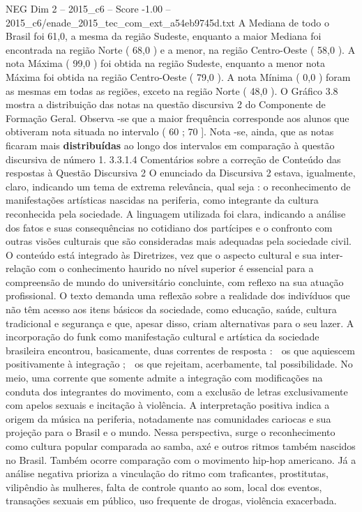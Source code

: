 \begin{textsample}{NEG Dim 2 – 2015\_c6 – Score -1.00 – 2015\_c6/enade\_2015\_tec\_com\_ext\_a54eb9745d.txt}
A Mediana de todo o Brasil foi 61,0, a mesma da região Sudeste, enquanto a maior Mediana foi encontrada na região Norte ( 68,0 ) e a menor, na região Centro-Oeste ( 58,0 ).
A nota Máxima ( 99,0 ) foi obtida na região Sudeste, enquanto a menor nota Máxima foi obtida na região Centro-Oeste ( 79,0 ).
A nota Mínima ( 0,0 ) foram as mesmas em todas as regiões, exceto na região Norte ( 48,0 ).
O Gráfico 3.8 mostra a distribuição das notas na questão discursiva 2 do Componente de Formação Geral.
Observa -se que a maior frequência corresponde aos alunos que obtiveram nota situada no intervalo ( 60 ; 70 ].
Nota -se, ainda, que as notas ficaram mais \textbf{distribuídas} ao longo dos intervalos em comparação à questão discursiva de número 1. 3.3.1.4 Comentários sobre a correção de Conteúdo das respostas à Questão Discursiva 2 O enunciado da Discursiva 2 estava, igualmente, claro, indicando um tema de extrema relevância, qual seja : o reconhecimento de manifestações artísticas nascidas na periferia, como integrante da cultura reconhecida pela sociedade.
A linguagem utilizada foi clara, indicando a análise dos fatos e suas consequências no cotidiano dos partícipes e o confronto com outras visões culturais que são consideradas mais adequadas pela sociedade civil.
O conteúdo está integrado às Diretrizes, vez que o aspecto cultural e sua inter-relação com o conhecimento haurido no nível superior é essencial para a compreensão de mundo do universitário concluinte, com reflexo na sua atuação profissional.
O texto demanda uma reflexão sobre a realidade dos indivíduos que não têm acesso aos itens básicos da sociedade, como educação, saúde, cultura tradicional e segurança e que, apesar disso, criam alternativas para o seu lazer.
A incorporação do funk como manifestação cultural e artística da sociedade brasileira encontrou, basicamente, duas correntes de resposta :  os que aquiescem positivamente à integração ;  os que rejeitam, acerbamente, tal possibilidade.
No meio, uma corrente que somente admite a integração com modificações na conduta dos integrantes do movimento, com a exclusão de letras exclusivamente com apelos sexuais e incitação à violência.
A interpretação positiva indica a origem da música na periferia, notadamente nas comunidades cariocas e sua projeção para o Brasil e o mundo.
Nessa perspectiva, surge o reconhecimento como cultura popular comparada ao samba, axé e outros ritmos também nascidos no Brasil.
Também ocorre comparação com o movimento hip-hop americano.
Já a análise negativa prioriza a vinculação do ritmo com traficantes, prostitutas, vilipêndio às mulheres, falta de controle quanto ao som, local dos eventos, transações sexuais em público, uso frequente de drogas, violência exacerbada.

\end{textsample}
